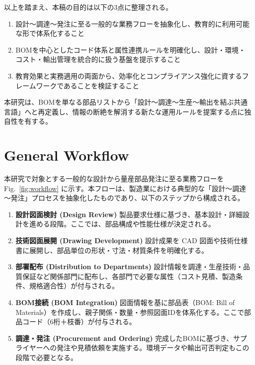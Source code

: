 \documentclass[10pt,conference]{IEEEtran}
\begin{document}
以上を踏まえ、本稿の目的は以下の3点に整理される。
\begin{enumerate}
  \item 設計～調達～発注に至る一般的な業務フローを抽象化し、教育的に利用可能な形で体系化すること
  \item BOMを中心としたコード体系と属性連携ルールを明確化し、設計・環境・コスト・輸出管理を統合的に扱う基盤を提示すること
  \item 教育効果と実務適用の両面から、効率化とコンプライアンス強化に資するフレームワークであることを検証すること
\end{enumerate}

本研究は、BOMを単なる部品リストから「設計～調達～生産～輸出を結ぶ共通言語」へと再定義し、情報の断絶を解消する新たな運用ルールを提案する点に独自性を有する。

\section{General Workflow}
本研究で対象とする一般的な設計から量産部品発注に至る業務フローを Fig.~\ref{fig:workflow} に示す。本フローは、製造業における典型的な「設計～調達～発注」プロセスを抽象化したものであり、以下のステップから構成される。

\begin{enumerate}
  \item \textbf{設計図面検討 (Design Review)}  
  製品要求仕様に基づき、基本設計・詳細設計を進める段階。ここでは、部品構成や性能仕様が決定される。
  
  \item \textbf{技術図面展開 (Drawing Development)}  
  設計成果を CAD 図面や技術仕様書に展開し、部品単位の形状・寸法・材質条件を明確化する。
  
  \item \textbf{部署配布 (Distribution to Departments)}  
  設計情報を調達・生産技術・品質保証など関係部門に配布し、各部門で必要な属性（コスト見積、製造条件、規格適合性）が付与される。
  
  \item \textbf{BOM接続 (BOM Integration)}  
  図面情報を基に部品表（BOM: Bill of Materials）を作成し、親子関係・数量・参照図面IDを体系化する。ここで部品コード（6桁＋枝番）が付与される。
  
  \item \textbf{調達・発注 (Procurement and Ordering)}  
  完成したBOMに基づき、サプライヤーへの発注や見積依頼を実施する。環境データや輸出可否判定もこの段階で必要となる。
\end{enumerate}
\end{document}
